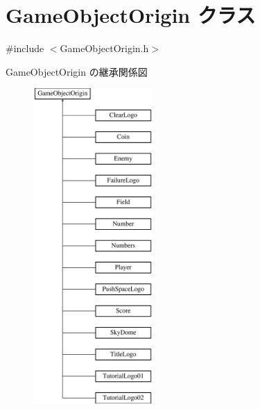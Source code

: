 \hypertarget{class_game_object_origin}{}\section{Game\+Object\+Origin クラス}
\label{class_game_object_origin}


{\ttfamily \#include $<$Game\+Object\+Origin.\+h$>$}

Game\+Object\+Origin の継承関係図\begin{figure}[H]
\begin{center}
\leavevmode
\includegraphics[height=12.000000cm]{class_game_object_origin}
\end{center}
\end{figure}
